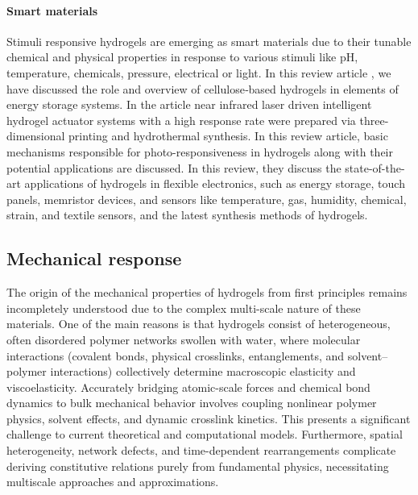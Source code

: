 \paragraph{Smart materials} Stimuli responsive hydrogels are emerging as smart materials due to their tunable chemical and physical properties in response to various stimuli like pH, temperature, chemicals, pressure, electrical or light. 
In this review article \citep{bishnoiCellulosebasedSmartMaterials2024}, we have discussed the role and overview of cellulose‐based hydrogels in elements of energy storage systems.
In the article \citep{zhaoIntelligentHydrogelActuators2021} near infrared laser driven intelligent hydrogel actuator systems with a high response rate were prepared via three-dimensional printing and hydrothermal synthesis.
In this review article\citep{shomePhotoresponsiveSmartHydrogels2024}, basic mechanisms responsible for photo-responsiveness in hydrogels along with their potential applications are discussed.
In this review\citep{duttaSmartMaterialsFlexible2024}, they discuss the state-of-the-art applications of hydrogels in flexible electronics, such as energy storage, touch panels, memristor devices, and sensors like temperature, gas, humidity, chemical, strain, and textile sensors, and the latest synthesis methods of hydrogels.

\subsection{Mechanical response}

The origin of the mechanical properties of hydrogels from first principles remains incompletely understood due to the complex multi-scale nature of these materials.
One of the main reasons is that hydrogels consist of heterogeneous, often disordered polymer networks swollen with water, where molecular interactions (covalent bonds, physical crosslinks, entanglements, and solvent–polymer interactions) collectively determine macroscopic elasticity and viscoelasticity. 
Accurately bridging atomic-scale forces and chemical bond dynamics to bulk mechanical behavior involves coupling nonlinear polymer physics, solvent effects, and dynamic crosslink kinetics. 
This presents a significant challenge to current theoretical and computational models. 
Furthermore, spatial heterogeneity, network defects, and time-dependent rearrangements complicate deriving constitutive relations purely from fundamental physics, necessitating multiscale approaches and approximations.



